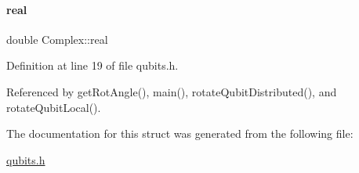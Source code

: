 \paragraph{\texorpdfstring{real}{real}}
{\footnotesize\ttfamily double Complex\+::real}



Definition at line 19 of file qubits.\+h.



Referenced by get\+Rot\+Angle(), main(), rotate\+Qubit\+Distributed(), and rotate\+Qubit\+Local().



The documentation for this struct was generated from the following file\+:\begin{DoxyCompactItemize}
\item 
\hyperlink{qubits_8h}{qubits.\+h}\end{DoxyCompactItemize}
